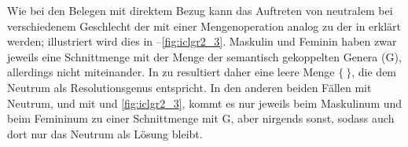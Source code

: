 Wie bei den Belegen mit direktem Bezug kann das Auftreten von neutralem
 bei verschiedenem Geschlecht der  mit einer
Mengenoperation analog zu der in  erklärt werden; illustriert
wird dies in --\ref{fig:iclgr2_3}. Maskulin und Feminin
haben zwar jeweils eine Schnittmenge mit der Menge der semantisch gekoppelten
Genera (G), allerdings nicht miteinander. In
 zu  resultiert daher eine leere Menge
$\{\ \}$, die dem Neutrum als Resolutionsgenus
entspricht. In den anderen beiden Fällen mit Neutrum,  und
 mit  und \ref{fig:iclgr2_3}, kommt es
nur jeweils beim Maskulinum und beim Femininum zu einer Schnittmenge mit
G, aber nirgends sonst, sodass auch dort nur das Neutrum als Lösung
bleibt.

